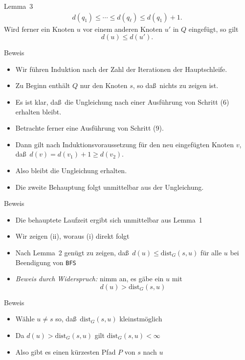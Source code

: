 \documentclass[aspectratio=1610, 11pt]{beamer}
\newcommand\dist{\mathrm{dist}}
\begin{document}
\begin{frame}
\begin{overprint}
\begin{block}{Lemma~3}
			\begin{align*}
				d(q_1)\leq\cdots\leq d(q_\ell)\leq d(q_1)+1.
			\end{align*}
			Wird ferner ein Knoten $u$ vor einem anderen Knoten $u'$ in $Q$ eingef\"ugt, so gilt $$d(u)\leq d(u').$$
		\end{block}
		\begin{exampleblock}{Beweis}
			\begin{itemize}
				\item Wir f\"uhren Induktion nach der Zahl der Iterationen der Hauptschleife.
				\item Zu Beginn enth\"alt $Q$ nur den Knoten $s$, so da\ss\ nichts zu zeigen ist.
				\item Es ist klar, da\ss\ die Ungleichung nach einer Ausf\"uhrung von Schritt (6) erhalten bleibt.
				\item Betrachte ferner eine Ausf\"uhrung von Schritt (9).
				\item Dann gilt nach Induktionsvoraussetzung f\"ur den neu eingef\"ugten Knoten $v$, da\ss\ $d(v)=d(v_1)+1\geq d(v_2)$.
				\item Also bleibt die Ungleichung erhalten.
				\item Die zweite Behauptung folgt unmittelbar aus der Ungleichung.
			\end{itemize}
		\end{exampleblock}
		\begin{exampleblock}{Beweis}
			\begin{itemize}
				\item Die behauptete Laufzeit ergibt sich unmittelbar aus Lemma~1
				\item Wir zeigen (ii), woraus (i) direkt folgt
				\item Nach Lemma~2 gen\"ugt zu zeigen, da\ss\ $d(u)\leq\dist_G(s,u)$ f\"ur alle $u$ bei Beendigung von {\tt BFS}
				\item \emph{Beweis durch Widerspruch:} nimm an, es g\"abe ein $u$ mit
					$$d(u)>\dist_G(s,u)$$
			\end{itemize}
		\end{exampleblock}
		\begin{exampleblock}{Beweis}
			\begin{itemize}
				\item W\"ahle $u\neq s$ so, da\ss\ $\dist_G(s,u)$ kleinstm\"oglich
				\item Da $d(u)>\dist_G(s,u)$ gilt $\dist_G(s,u)<\infty$
				\item Also gibt es einen k\"urzesten Pfad $P$ von $s$ nach $u$

\end{itemize}
\end{exampleblock}
\end{overprint}
\end{frame}
\end{document}
